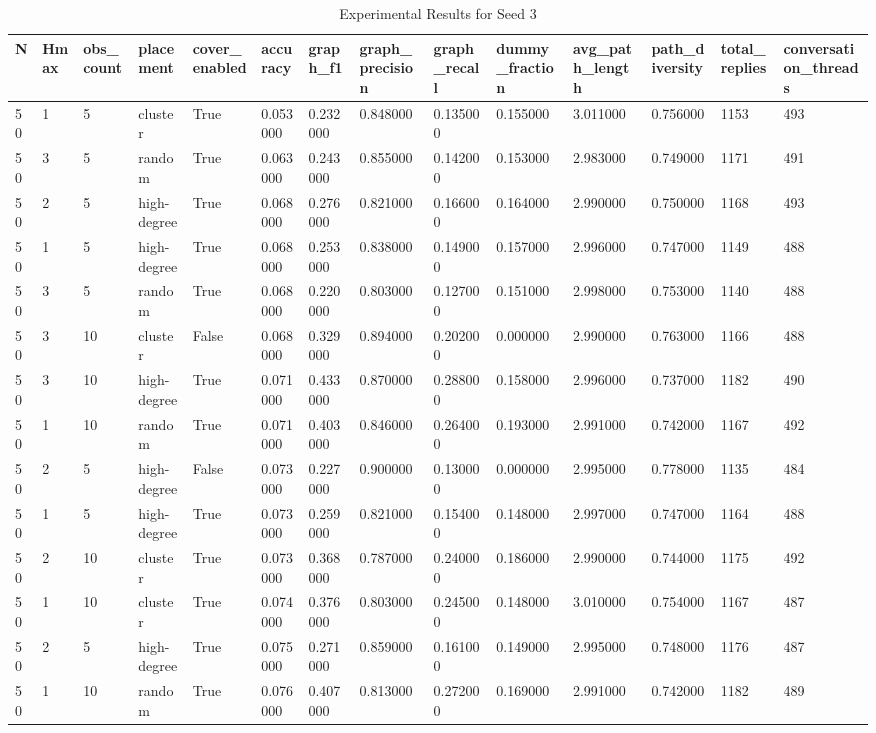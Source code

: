 \begin{table}
\caption{Experimental Results for Seed 3}
\label{tab:results_seed_3}
\begin{tabular}{llllllllllllll}
\toprule
N & Hmax & obs_count & placement & cover_enabled & accuracy & graph_f1 & graph_precision & graph_recall & dummy_fraction & avg_path_length & path_diversity & total_replies & conversation_threads \\
\midrule
50 & 1 & 5 & cluster & True & 0.053000 & 0.232000 & 0.848000 & 0.135000 & 0.155000 & 3.011000 & 0.756000 & 1153 & 493 \\
50 & 3 & 5 & random & True & 0.063000 & 0.243000 & 0.855000 & 0.142000 & 0.153000 & 2.983000 & 0.749000 & 1171 & 491 \\
50 & 2 & 5 & high-degree & True & 0.068000 & 0.276000 & 0.821000 & 0.166000 & 0.164000 & 2.990000 & 0.750000 & 1168 & 493 \\
50 & 1 & 5 & high-degree & True & 0.068000 & 0.253000 & 0.838000 & 0.149000 & 0.157000 & 2.996000 & 0.747000 & 1149 & 488 \\
50 & 3 & 5 & random & True & 0.068000 & 0.220000 & 0.803000 & 0.127000 & 0.151000 & 2.998000 & 0.753000 & 1140 & 488 \\
50 & 3 & 10 & cluster & False & 0.068000 & 0.329000 & 0.894000 & 0.202000 & 0.000000 & 2.990000 & 0.763000 & 1166 & 488 \\
50 & 3 & 10 & high-degree & True & 0.071000 & 0.433000 & 0.870000 & 0.288000 & 0.158000 & 2.996000 & 0.737000 & 1182 & 490 \\
50 & 1 & 10 & random & True & 0.071000 & 0.403000 & 0.846000 & 0.264000 & 0.193000 & 2.991000 & 0.742000 & 1167 & 492 \\
50 & 2 & 5 & high-degree & False & 0.073000 & 0.227000 & 0.900000 & 0.130000 & 0.000000 & 2.995000 & 0.778000 & 1135 & 484 \\
50 & 1 & 5 & high-degree & True & 0.073000 & 0.259000 & 0.821000 & 0.154000 & 0.148000 & 2.997000 & 0.747000 & 1164 & 488 \\
50 & 2 & 10 & cluster & True & 0.073000 & 0.368000 & 0.787000 & 0.240000 & 0.186000 & 2.990000 & 0.744000 & 1175 & 492 \\
50 & 1 & 10 & cluster & True & 0.074000 & 0.376000 & 0.803000 & 0.245000 & 0.148000 & 3.010000 & 0.754000 & 1167 & 487 \\
50 & 2 & 5 & high-degree & True & 0.075000 & 0.271000 & 0.859000 & 0.161000 & 0.149000 & 2.995000 & 0.748000 & 1176 & 487 \\
50 & 1 & 10 & random & True & 0.076000 & 0.407000 & 0.813000 & 0.272000 & 0.169000 & 2.991000 & 0.742000 & 1182 & 489 \\

\end{tabular}
\end{table}
